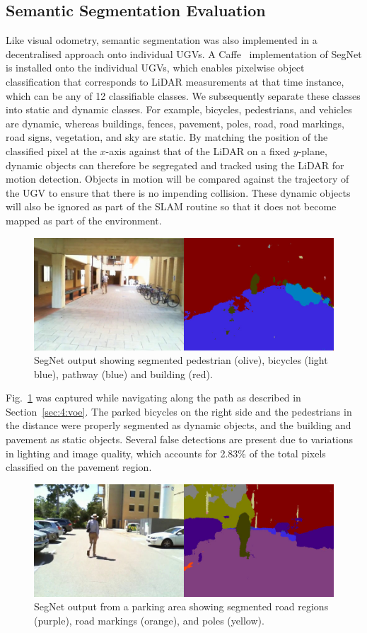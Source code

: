 \subsection{Semantic Segmentation Evaluation}
Like visual odometry, semantic segmentation was also implemented in a decentralised approach onto individual UGVs. A Caffe~\cite{jia_caffe:_2014} implementation of SegNet is installed onto the individual UGVs, which enables pixelwise object classification that corresponds to LiDAR measurements at that time instance, which can be any of 12 classifiable classes. We subsequently separate these classes into static and dynamic classes. For example, bicycles, pedestrians, and vehicles are dynamic, whereas buildings, fences, pavement, poles, road, road markings, road signs, vegetation, and sky are static. By matching the position of the classified pixel at the $x$-axis against that of the LiDAR on a fixed $y$-plane, dynamic objects can therefore be segregated and tracked using the LiDAR for motion detection. Objects in motion will be compared against the trajectory of the UGV to ensure that there is no impending collision. These dynamic objects will also be ignored as part of the SLAM routine so that it does not become mapped as part of the environment.

\begin{figure}[H]
	\centering
	\includegraphics[width=0.8\linewidth]{fig12}
	\caption[SegNet output 1]{SegNet output showing segmented pedestrian (olive), bicycles (light blue), pathway (blue) and building (red).}
	\label{fig:4:ss1}
\end{figure}

Fig.~\ref{fig:4:ss1} was captured while navigating along the path as described in Section~\ref{sec:4:voe}. The parked bicycles on the right side and the pedestrians in the distance were properly segmented as dynamic objects, and the building and pavement as static objects. Several false detections are present due to variations in lighting and image quality, which accounts for 2.83\% of the total pixels classified on the pavement region.

\begin{figure}[H]
	\centering
	\includegraphics[width=0.8\linewidth]{fig13}
	\caption[SegNet output 2]{SegNet output from a parking area showing segmented road regions (purple), road markings (orange), and poles (yellow).}
	\label{fig:4:ss2}
\end{figure}

